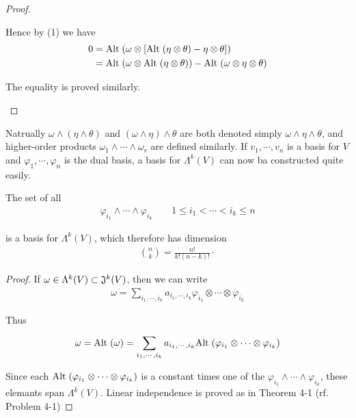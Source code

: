 \begin{proof}
\begin{enumerate}[label=(\arabic*)]
            Hence by (1) we have 
            \begin{align*}
                0 
                    & = \mathrm{Alt}\;(\omega\otimes [\mathrm{Alt}\;(\eta\otimes\theta) - \eta\otimes\theta]) \\
                    & = \mathrm{Alt}\;(\omega\otimes\mathrm{Alt}\;(\eta\otimes\theta)) - \mathrm{Alt}\;(\omega\otimes\eta\otimes\theta) 
            \end{align*}

            The equality is proved similarly.
    \end{enumerate}
\end{proof}

Natrually $\omega\wedge(\eta\wedge\theta)$ and $(\omega\wedge\eta)\wedge\theta$ are both denoted simply 
$\omega\wedge\eta\wedge\theta$, and higher-order products $\omega_1\wedge\cdots\wedge\omega_r$ are defined 
similarly. If $v_1, \cdots, v_n$ is a basis for $V$ and $\varphi_1,\cdots, \varphi_n$ is the dual basis,
a basis for $\Lambda^k(V)$ can now ba constructed quite easily. 

\begin{theorem}
    The set of all
    \begin{align*}
        \varphi_{i_1}\wedge\cdots\wedge\varphi_{i_k}\quad\quad 1\leq i_1<\cdots<i_k\le n
    \end{align*} 

    is a basis for $\Lambda^k(V)$, which therefore has dimension 
    \begin{align*}
        \binom nk=\frac{n!}{k!(n-k)!}\cdotp 
    \end{align*}
\end{theorem}

\begin{proof}
    If $\omega\in \Lambda^k(V)\subset \mathfrak{J}^k(V)$, then we can write 
    \begin{align*}
        \omega = \sum_{i_1, \cdots, i_k}^{}{a_{i_1,\cdots,i_k}\varphi_{i_1}\otimes\cdots\otimes\varphi_{i_k}}
    \end{align*}

    Thus 
    \begin{align*}
        \omega
        = \mathrm{Alt}\;(\omega) 
        = \sum_{i_1, \cdots, i_k}^{}{a_{i_1,\cdots,i_k}\mathrm{Alt}\;(\varphi_{i_1}\otimes\cdots\otimes\varphi_{i_k})}
    \end{align*}

    Since each $\mathrm{Alt}\;(\varphi_{i_1}\otimes\cdots\otimes\varphi_{i_k})$ is a constant times one of the 
    $\varphi_{i_1}\wedge\cdots\wedge\varphi_{i_k}$, these elemants span $\Lambda^k(V)$. Linear independence 
    is proved as in Theorem 4-1 (rf. Problem 4-1)
\end{proof}

